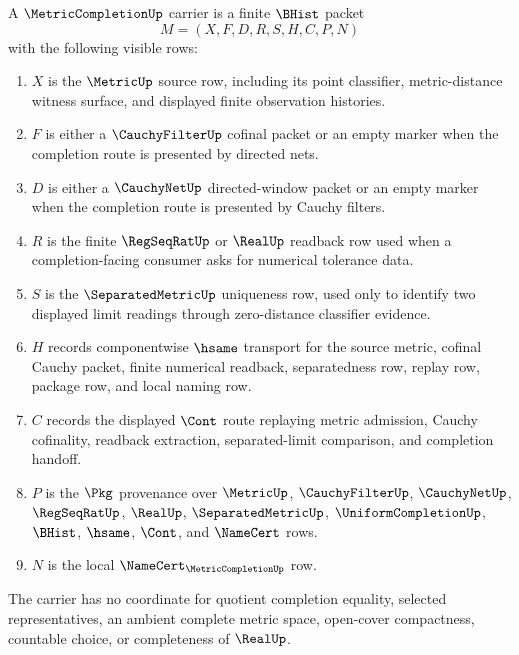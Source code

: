 \begin{definition}
\label{def:metric-completion-carrier}
A $\MetricCompletionUp$ carrier is a finite $\BHist$ packet
$$
M=(X,F,D,R,S,H,C,P,N)
$$
with the following visible rows:
\begin{enumerate}
\item $X$ is the $\MetricUp$ source row, including its point classifier, metric-distance witness surface, and displayed finite observation histories.
\item $F$ is either a $\CauchyFilterUp$ cofinal packet or an empty marker when the completion route is presented by directed nets.
\item $D$ is either a $\CauchyNetUp$ directed-window packet or an empty marker when the completion route is presented by Cauchy filters.
\item $R$ is the finite $\RegSeqRatUp$ or $\RealUp$ readback row used when a completion-facing consumer asks for numerical tolerance data.
\item $S$ is the $\SeparatedMetricUp$ uniqueness row, used only to identify two displayed limit readings through zero-distance classifier evidence.
\item $H$ records componentwise $\hsame$ transport for the source metric, cofinal Cauchy packet, finite numerical readback, separatedness row, replay row, package row, and local naming row.
\item $C$ records the displayed $\Cont$ route replaying metric admission, Cauchy cofinality, readback extraction, separated-limit comparison, and completion handoff.
\item $P$ is the $\Pkg$ provenance over $\MetricUp$, $\CauchyFilterUp$, $\CauchyNetUp$, $\RegSeqRatUp$, $\RealUp$, $\SeparatedMetricUp$, $\UniformCompletionUp$, $\BHist$, $\hsame$, $\Cont$, and $\NameCert$ rows.
\item $N$ is the local $\NameCert_{\MetricCompletionUp}$ row.
\end{enumerate}
The carrier has no coordinate for quotient completion equality, selected representatives, an ambient complete metric space, open-cover compactness, countable choice, or completeness of $\RealUp$.
\end{definition}

